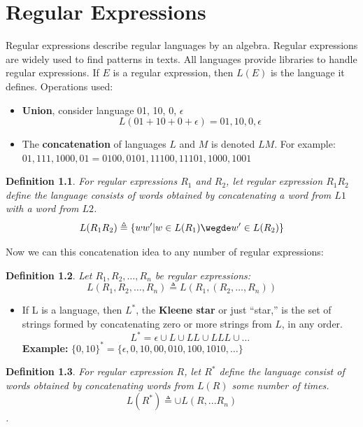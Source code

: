 \documentclass{report}
\newtheorem{definition}{Definition}[chapter]
\begin{document}
\chapter{Regular Expressions}
Regular expressions describe regular languages by an algebra. Regular expressions are widely used to find patterns in texts. All languages provide libraries to handle regular expressions. If $E$ is a regular expression, then $L(E)$ is the language it defines. Operations used:
\begin{itemize}
    \item \textbf{Union}, consider language {01, 10, 0, $\epsilon$}
    $$L(01 + 10 + 0 + \epsilon) = {01, 10, 0, \epsilon}$$
    \item The \textbf{concatenation} of languages $L$ and $M$ is denoted $LM$. For example:  ${01,111,10}{00, 01} = {0100, 0101, 11100, 11101, 1000, 1001}$
\end{itemize}
\begin{definition}
For regular expressions $R_1$ and $R_2$, let regular expression $R_1R_2$ define the language consists of words obtained by concatenating a word from $L1$ with a word from $L2$. 
$$L(R_1 R_2) \triangleq \{ww' | w \in L(R_1) \wegde w' \in L(R_2)\}$$
\end{definition}
Now we can this concatenation idea to any number of regular expressions:
\begin{definition}
Let $R_1,R_2,\ldots,R_n$ be regular expressions:
$$L(R_1,R_2,\ldots,R_n) \triangleq L(R_1,(R_2,\ldots,R_n))$$
\end{definition}

\begin{itemize}
    \item If L is a language, then $L^*$, the \textbf{Kleene star} or just “star,” is the set of strings formed by concatenating zero or more strings from $L$, in any order. 
    $$L^*={\epsilon} \cup L \cup LL \cup LLL \cup \ldots$$
    \textbf{Example:} $\{0,10\}^* = \{\epsilon, 0, 10, 00, 010, 100, 1010,\ldots \}$
\end{itemize}
    
\begin{definition}
For regular expression $R$, let $R^*$ define the language consist of words obtained by concatenating words from $L(R)$ some number of times.
       $$L(R^*) \triangleq \cup L(R,...R_n)$$. 
 \end{definition}
 
\end{document}
